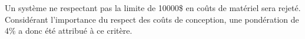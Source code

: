 Un système ne respectant pas la limite de 10000\$ en coûts de matériel sera rejeté. Considérant l'importance du respect des coûts de conception, une pondération de 4\% a donc été attribué à ce critère.










